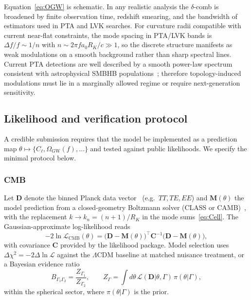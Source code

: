 \documentclass[12pt,a4paper]{article}
\newcommand{\RK}{R_K}
\begin{document}
Equation~\eqref{eq:OGW} is schematic. In any realistic
analysis the $\delta$-comb is broadened by finite
observation time, redshift smearing, and the bandwidth
of estimators used in PTA and LVK searches. For curvature
radii compatible with current near-flat constraints, the
mode spacing in PTA/LVK bands is $\Delta f/f \sim 1/n$
with $n \sim 2\pi f a_0 \RK/c \gg 1$, so the discrete
structure manifests as weak modulations on a smooth
background rather than sharp spectral lines. Current PTA
detections are well described by a smooth power-law
spectrum consistent with astrophysical SMBHB
populations~\cite{NANOGrav2023,IPTA2022}; therefore
topology-induced modulations must lie in a marginally
allowed regime or require next-generation sensitivity.

\subsection{Likelihood and verification protocol}
\label{sec:likelihood}

A credible submission requires that the model be
implemented as a prediction map $\theta\mapsto\{C_\ell,
\Omega_{\mathrm{GW}}(f),\ldots\}$ and tested against
public likelihoods. We specify the minimal protocol below.

\subsubsection*{CMB}

Let $\mathbf{D}$ denote the binned Planck data
vector~\cite{Planck2018power,Planck2018params}
(e.g.\ $TT, TE, EE$) and $\mathbf{M}(\theta)$ the
model prediction from a closed-geometry Boltzmann solver
(CLASS or CAMB)~\cite{CLASS2011,Lewis2000}, with the
replacement $k\to k_n = (n+1)/\RK$ in the mode
sums~\eqref{eq:Cell}. The Gaussian-approximate log-likelihood
reads
\begin{equation}
  -2\ln\mathcal{L}_{\mathrm{CMB}}(\theta)
  = \bigl(\mathbf{D} - \mathbf{M}(\theta)\bigr)^\top
    \mathbf{C}^{-1}
    \bigl(\mathbf{D} - \mathbf{M}(\theta)\bigr),
  \label{eq:like}
\end{equation}
with covariance $\mathbf{C}$ provided by the likelihood
package. Model selection uses $\Delta\chi^2 =
-2\Delta\ln\mathcal{L}$ against the $\Lambda$CDM baseline
at matched nuisance treatment, or a Bayesian evidence
ratio
\begin{equation}
  B_{\Gamma_1\Gamma_2} = \frac{Z_{\Gamma_1}}{Z_{\Gamma_2}},
  \qquad
  Z_\Gamma = \int d\theta\,\mathcal{L}(\mathbf{D}|\theta,\Gamma)\,
  \pi(\theta|\Gamma),
  \label{eq:bayes}
\end{equation}
within the spherical sector, where $\pi(\theta|\Gamma)$
is the prior.
\end{document}
